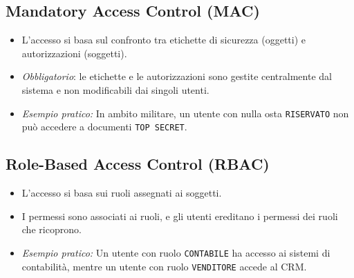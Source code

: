 \subsection{Mandatory Access Control (MAC)}
\begin{itemize}
    \item L'accesso si basa sul confronto tra etichette di sicurezza (oggetti) e autorizzazioni (soggetti).
    \item \textit{Obbligatorio}: le etichette e le autorizzazioni sono gestite centralmente dal sistema e non modificabili dai singoli utenti.
    \item \textit{Esempio pratico:} In ambito militare, un utente con nulla osta \texttt{RISERVATO} non può accedere a documenti \texttt{TOP SECRET}.
\end{itemize}

\subsection{Role-Based Access Control (RBAC)}
\begin{itemize}
    \item L'accesso si basa sui ruoli assegnati ai soggetti.
    \item I permessi sono associati ai ruoli, e gli utenti ereditano i permessi dei ruoli che ricoprono.
    \item \textit{Esempio pratico:} Un utente con ruolo \texttt{CONTABILE} ha accesso ai sistemi di contabilità, mentre un utente con ruolo \texttt{VENDITORE} accede al CRM.
\end{itemize}

